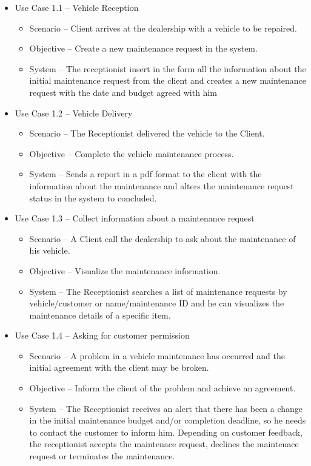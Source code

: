 \begin{itemize}
    \item Use Case 1.1 – Vehicle Reception
    \begin{itemize}
      \item Scenario – Client arrives at the dealership with a vehicle to be repaired.
      \item Objective – Create a new maintenance request in the system.
      \item System – The receptionist insert in the form all the information about the initial maintenance request from the client and creates a new maintenance request with the date and budget agreed with him 
    \end{itemize}
    \item Use Case 1.2 – Vehicle Delivery 
    \begin{itemize}
      \item Scenario – The Receptionist delivered the vehicle to the Client.
      \item Objective – Complete the vehicle maintenance process.
      \item System – Sends a report in a pdf format to the client with the information about the maintenance and alters the maintenance request status in the system to concluded. 
    \end{itemize}
    \item Use Case 1.3 – Collect information about a maintenance request
    \begin{itemize}
      \item Scenario – A Client call the dealership to ask about the maintenance of his vehicle.
      \item Objective – Visualize the maintenance information.
      \item System –  The Receptionist searches a list of maintenance requests by vehicle/customer or name/maintenance ID and he can visualizes the maintenance details of a specific item.
    \end{itemize}
    \item Use Case 1.4 – Asking for customer permission
    \begin{itemize}
      \item Scenario – A problem in a vehicle maintenance has occurred and the initial agreement with the client may be broken.
      \item Objective – Inform the client of the problem and achieve an agreement.
      \item System – The Receptionist receives an alert that there has been a change in the initial maintenance budget and/or completion deadline, so he needs to contact the customer to inform him. Depending on customer feedback, the receptionist accepts the maintenace request, declines the maintenace request or terminates the maintenance.
    \end{itemize}
  \end{itemize}  
  \hfill \break


